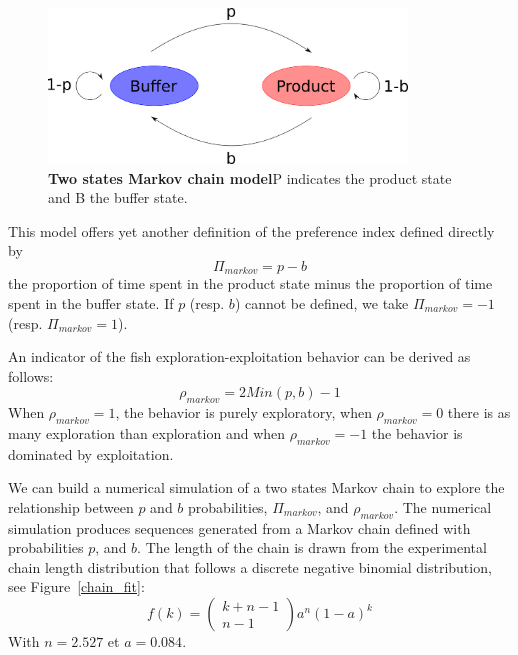   \begin{figure}[h]
    \centering
    \includegraphics[width=0.85\textwidth]{part_2/assets/model.png}
    \caption{\textbf{Two states Markov chain model}P indicates the product state and B the buffer state.}
    \label{markov_model}
  \end{figure}

  This model offers yet another definition of the preference index defined directly by
  \begin{equation}
    \Pi_{markov} = p - b
  \end{equation}
  \noindent the proportion of time spent in the product state minus the proportion of time spent in the buffer state. If $p$ (resp. $b$) cannot be defined, we take $\Pi_{markov} = -1$ (resp. $\Pi_{markov} = 1$).

 An indicator of the fish exploration-exploitation behavior can be derived as follows:
  \begin{equation}
    \rho_{markov} = 2Min(p,b) - 1
  \end{equation}
   \noindent When $\rho_{markov} = 1$,  the  behavior is purely exploratory, when $\rho_{markov} = 0$ there is as many exploration than exploration and when $\rho_{markov} = -1$ the behavior is dominated by exploitation.

  We can build a numerical simulation of a two states Markov chain to explore the relationship between $p$ and $b$ probabilities, $\Pi_{markov}$, and $\rho_{markov}$. The numerical simulation produces sequences generated from a Markov chain defined with probabilities $p$, and $b$. The length of the chain is drawn from the experimental chain length distribution that follows a discrete negative binomial distribution, see Figure~\ref{chain_fit}:
  \begin{equation}
    f(k) = \begin{pmatrix}
    k+n-1\\
    n-1
    \end{pmatrix}
    a^n(1-a)^k
  \end{equation}
  \noindent With $n=2.527$ et $a=0.084$.

